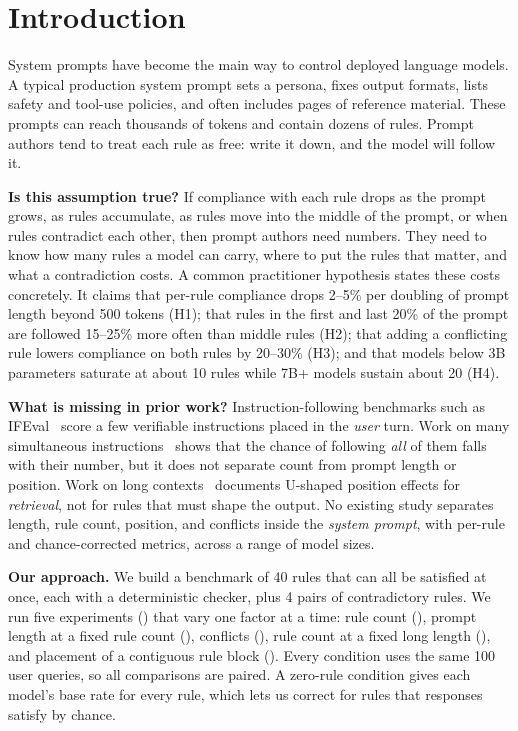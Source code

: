 \section{Introduction}
\label{sec:intro}

System prompts have become the main way to control deployed language models.
A typical production system prompt sets a persona, fixes output formats, lists safety and tool-use policies, and often includes pages of reference material.
These prompts can reach thousands of tokens and contain dozens of rules.
Prompt authors tend to treat each rule as free: write it down, and the model will follow it.

{\bf Is this assumption true?}
If compliance with each rule drops as the prompt grows, as rules accumulate, as rules move into the middle of the prompt, or when rules contradict each other, then prompt authors need numbers.
They need to know how many rules a model can carry, where to put the rules that matter, and what a contradiction costs.
A common practitioner hypothesis states these costs concretely.
It claims that per-rule compliance drops 2--5\% per doubling of prompt length beyond 500 tokens (H1); that rules in the first and last 20\% of the prompt are followed 15--25\% more often than middle rules (H2); that adding a conflicting rule lowers compliance on both rules by 20--30\% (H3); and that models below 3B parameters saturate at about 10 rules while 7B+ models sustain about 20 (H4).

{\bf What is missing in prior work?}
Instruction-following benchmarks such as IFEval~\cite{zhou2023ifeval} score a few verifiable instructions placed in the {\em user} turn.
Work on many simultaneous instructions~\cite{harada2024curse,jiang2024followbench,wen2024complexbench} shows that the chance of following {\em all} of them falls with their number, but it does not separate count from prompt length or position.
Work on long contexts~\cite{liu2024lost} documents U-shaped position effects for {\em retrieval}, not for rules that must shape the output.
No existing study separates length, rule count, position, and conflicts inside the {\em system prompt}, with per-rule and chance-corrected metrics, across a range of model sizes.

{\bf Our approach.}
We build a benchmark of 40 rules that can all be satisfied at once, each with a deterministic checker, plus 4 pairs of contradictory rules.
We run five experiments () that vary one factor at a time: rule count (\expA), prompt length at a fixed rule count (\expB), conflicts (\expD), rule count at a fixed long length (\expE), and placement of a contiguous rule block (\expF).
Every condition uses the same 100 user queries, so all comparisons are paired.
A zero-rule condition gives each model's base rate for every rule, which lets us correct for rules that responses satisfy by chance.

